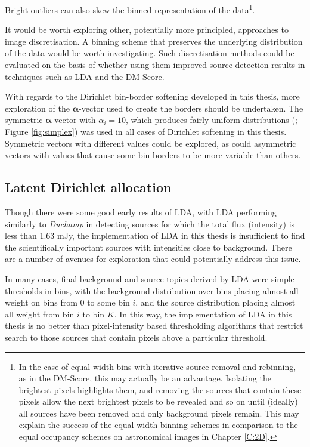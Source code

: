 Bright outliers can also skew the binned representation of the data\footnote{In the case of equal width bins with iterative source removal and rebinning, as in the DM-Score, this may actually be an advantage. Isolating the brightest pixels highlights them, and removing the sources that contain these pixels allow the next brightest pixels to be revealed and so on until (ideally) all sources have been removed and only background pixels remain. This may explain the success of the equal width binning schemes in comparison to the equal occupancy schemes on astronomical images in Chapter \ref{C:2D}.}.

It would be worth exploring other, potentially more principled, approaches to image discretisation. A binning scheme that preserves the underlying distribution of the data would be worth investigating. Such discretisation methods could be evaluated on the basis of whether using them improved source detection results in techniques such as LDA and the DM-Score.

With regards to the Dirichlet bin-border softening developed in this thesis, more exploration of the $\boldsymbol{\alpha}$-vector used to create the borders should be undertaken. The symmetric $\boldsymbol{\alpha}$-vector with $\alpha_i = 10$, which produces fairly uniform distributions (\cite{frigyik2010introduction}; Figure \ref{fig:simplex}) was used in all cases of Dirichlet softening in this thesis. Symmetric vectors with different values could be explored, as could asymmetric vectors with values that cause some bin borders to be more variable than others.

\subsection{Latent Dirichlet allocation}

Though there were some good early results of LDA, with LDA performing similarly to \emph{Duchamp} in detecting sources for which the total flux (intensity) is less than 1.63 mJy, the implementation of LDA in this thesis is insufficient to find the scientifically important sources with intensities close to background. There are a number of avenues for exploration that could potentially address this issue.

In many cases, final background and source topics derived by LDA were simple thresholds in bins, with the background distribution over bins placing almost all weight on bins from $0$ to some bin $i$, and the source distribution placing almost all weight from bin $i$ to bin $K$. In this way, the implementation of LDA in this thesis is no better than pixel-intensity based thresholding algorithms that restrict search to those sources that contain pixels above a particular threshold. 

